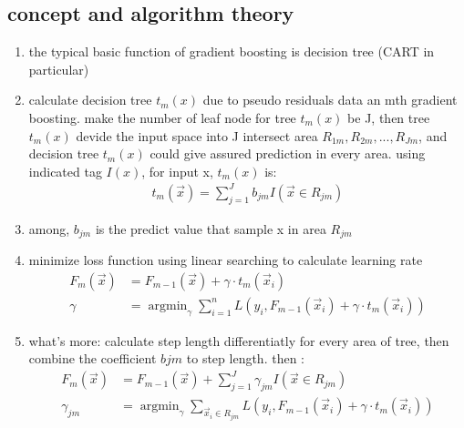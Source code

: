 \documentclass[12pt]{ctexart}%
\begin{document}
		\subsection{\quad concept and algorithm theory}
			\begin{enumerate}
				\item the typical basic function of gradient boosting is decision tree (CART in particular)
				
				\item calculate decision tree $t_m(x)$ due to pseudo residuals data an mth gradient boosting. make the number of leaf node for tree $t_m(x)$ be J, then tree $t_m(x)$ devide the input space into J intersect area $R_{1m}, R_{2m}, ..., R_{Jm}$, and decision tree $t_m(x)$ could give assured prediction in every area. using indicated tag $I(x)$, for input x, $t_m(x)$ is:
					\begin{align}
						t_m(\vec{x}) = \sum_{j=1}^{J} b_{jm} I(\vec{x} \in R_{jm})
					\end{align} 
					
				\item among, $b_{jm}$ is the predict value that sample x in area $R_{jm}$
					
				\item minimize loss function using linear searching to calculate learning rate
					\begin{align}
						F_m(\vec{x}) &= F_{m-1}(\vec{x}) + \gamma\cdot t_m(\vec{x}_i)\\
						\gamma &= \mathop{\arg\min}_\gamma \sum_{i=1}^{n} L(y_i, F_{m-1}(\vec{x}_i) + \gamma\cdot t_m(\vec{x}_i))
					\end{align}
					
				\item what's more: calculate step length differentiatly for every area of tree, then combine the coefficient $b{jm}$ to step length. then :
					\begin{align}
						F_m(\vec{x}) &= F_{m-1}(\vec{x}) + \sum_{j=1}^{J}\gamma_{jm}I(\vec{x}\in{R_{jm}})\\
						\gamma_{jm} &= \mathop{\arg\min}_{\gamma} \sum_{\vec{x}_i\in{R_{jm}}} L(y_i, F_{m-1}(\vec{x}_i) + \gamma\cdot t_m(\vec{x}_i)) 
					\end{align}
			\end{enumerate}
	
\end{document}
